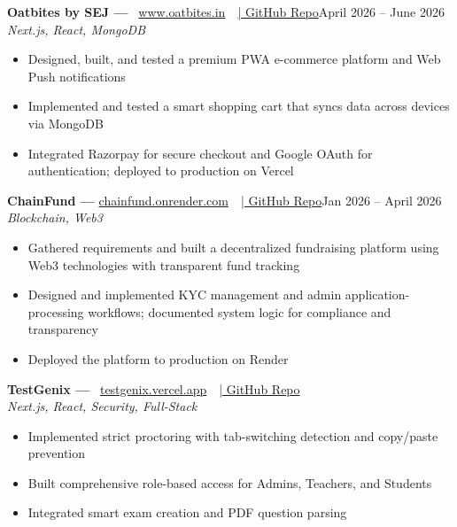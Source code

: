\documentclass[letterpaper,11pt]{article}
\newcommand{\projectentrywithlinks}[4]{%
  \noindent\textbf{#1}~#2\hfill#3\\
  \textit{#4}\vspace{2pt}
}
\begin{document}
\projectentrywithlinks{Oatbites by SEJ --- }%
  {\href{https://www.oatbites.in}{www.oatbites.in}~~\href{https://github.com/sumeetgwork-stack/oatbites}{| GitHub Repo}}%
  {April 2026 -- June 2026}%
  {Next.js, React, MongoDB}

\begin{itemize}[leftmargin=0.25in, itemsep=2pt, parsep=0pt, topsep=0pt]
  \item Designed, built, and tested a premium PWA e-commerce platform and Web Push notifications
  \item Implemented and tested a smart shopping cart that syncs data across devices via MongoDB
  \item Integrated Razorpay for secure checkout and Google OAuth for authentication; deployed to production on Vercel
\end{itemize}

\vspace{4pt}

\noindent\textbf{ChainFund --- }\href{https://chainfund.onrender.com}{chainfund.onrender.com}~~\href{https://github.com/sumeetgwork-stack/chainfund}{| GitHub Repo}\hfill Jan 2026 -- April 2026\\
\textit{Blockchain, Web3}\vspace{2pt}

\begin{itemize}[leftmargin=0.25in, itemsep=2pt, parsep=0pt, topsep=0pt]
  \item Gathered requirements and built a decentralized fundraising platform using Web3 technologies with transparent fund tracking
  \item Designed and implemented KYC management and admin application-processing workflows; documented system logic for compliance and transparency
  \item Deployed the platform to production on Render
\end{itemize}

\vspace{4pt}

\projectentrywithlinks{TestGenix --- }%
  {\href{https://testgenix.vercel.app}{testgenix.vercel.app}~~\href{https://github.com/sumeetgwork-stack/quizify-app}{| GitHub Repo}}%
  {}%
  {Next.js, React, Security, Full-Stack}

\begin{itemize}[leftmargin=0.25in, itemsep=2pt, parsep=0pt, topsep=0pt]
  \item Implemented strict proctoring with tab-switching detection and copy/paste prevention
  \item Built comprehensive role-based access for Admins, Teachers, and Students
  \item Integrated smart exam creation and PDF question parsing
\end{itemize}
\end{document}
